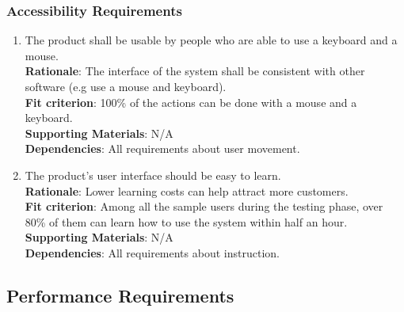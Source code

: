 \documentclass{article}
\begin{document}
\subsubsection{Accessibility Requirements}
\begin{enumerate}[UH5.1]
    \item The product shall be usable by people who are able to use a keyboard and a mouse.\\
    \textbf{Rationale}: The interface of the system shall be consistent with other software (e.g use a
     mouse and keyboard).\\
    \textbf{Fit criterion}: 100\% of the actions can be done with a mouse and a keyboard.\\
\textbf{Supporting Materials}: N/A\\
\textbf{Dependencies}: All requirements about user movement.\\
    
\item The product's user interface should be easy to learn.\\
\textbf{Rationale}: Lower learning costs can help attract more customers.\\
\textbf{Fit criterion}: Among all the sample users during the testing phase, over 80\% of them
 can learn how to use the system within half an hour.\\
\textbf{Supporting Materials}: N/A\\
\textbf{Dependencies}: All requirements about instruction.\\

\end{enumerate}
\subsection{Performance Requirements}
\end{document}
